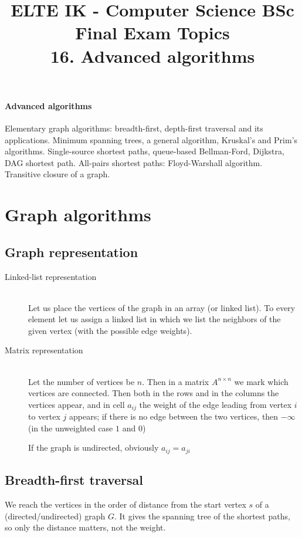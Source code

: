 \documentclass[margin=0px]{article}
\title{\textbf{{\Large ELTE IK - Computer Science BSc} \vspace{0.2cm} \\ {\huge Final Exam Topics}} \vspace{0.3cm} \\ 16. Advanced algorithms}
\author{}
\date{}
\newenvironment{tetel}[1]{\paragraph{#1 \\}}{}
\begin{document}
\maketitle

\begin{center}
\end{center}

\begin{tetel}{Advanced algorithms}
    Elementary graph algorithms: breadth-first, depth-first traversal and its applications. Minimum spanning trees, a general algorithm, Kruskal's and Prim's algorithms. Single-source shortest paths, queue-based Bellman-Ford, Dijkstra, DAG shortest path. All-pairs shortest paths: Floyd-Warshall algorithm. Transitive closure of a graph.
\end{tetel}

\section{Graph algorithms}
\subsection{Graph representation}
\begin{description}
    \item[Linked-list representation] \hfill \\
        Let us place the vertices of the graph in an array (or linked list). To every element let us assign a linked list in which we list the neighbors of the given vertex (with the possible edge weights).
    \item[Matrix representation] \hfill \\
        Let the number of vertices be $n$. Then in a matrix $A^{n\times n}$ we mark which vertices are connected. Then both in the rows and in the columns the vertices appear, and in cell $a_{ij}$ the weight of the edge leading from vertex $i$ to vertex $j$ appears; if there is no edge between the two vertices, then $-\infty$ (in the unweighted case $1$ and $0$)

        If the graph is undirected, obviously $a_{ij} = a_{ji}$
\end{description}
\subsection{Breadth-first traversal}
We reach the vertices in the order of distance from the start vertex $s$ of a (directed/undirected) graph $G$. It gives the spanning tree of the shortest paths, so only the distance matters, not the weight.
\end{document}
